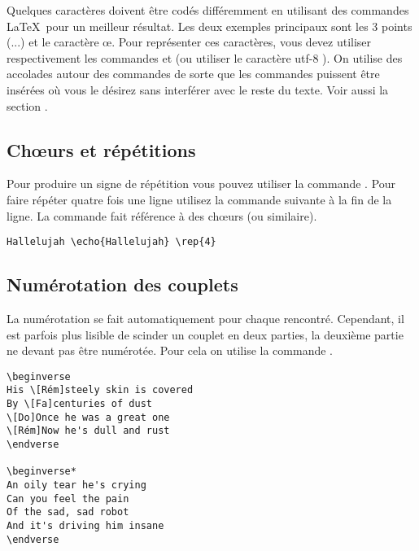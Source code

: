 \documentclass[versionenligne]{patacrep}
\begin{document}
Quelques caractères doivent être codés différemment en utilisant des
commandes \LaTeX\, pour un meilleur résultat. Les deux exemples
principaux sont les 3 points (...) et le caractère \oe{}. Pour
représenter ces caractères, vous devez utiliser respectivement les
commandes  et  (ou utiliser le
caractère utf-8 ). On utilise des accolades autour des commandes de
sorte que les commandes puissent être insérées où vous le désirez sans
interférer avec le reste du texte. Voir aussi
la section .

\subsection{Ch\oe{}urs et répétitions}

Pour produire un signe de répétition vous pouvez utiliser la commande
. Pour faire répéter quatre fois une ligne utilisez la
commande suivante à la fin de la ligne. La commande 
fait référence à des chœurs (ou similaire).

\begin{verbatim}
Hallelujah \echo{Hallelujah} \rep{4}
\end{verbatim}

\subsection{Numérotation des couplets}

La numérotation se fait automatiquement pour chaque 
rencontré. Cependant, il est parfois plus lisible de scinder un
couplet en deux parties, la deuxième partie ne devant pas être
numérotée. Pour cela on utilise la commande .

\begin{verbatim}
\beginverse
His \[Rém]steely skin is covered
By \[Fa]centuries of dust
\[Do]Once he was a great one
\[Rém]Now he's dull and rust
\endverse

\beginverse*
An oily tear he's crying
Can you feel the pain
Of the sad, sad robot
And it's driving him insane
\endverse
\end{verbatim}
\end{document}
